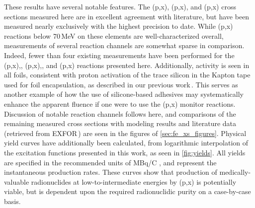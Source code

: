 These results have several notable features.
The 
(p,x), (p,x), and (p,x) cross sections measured here are in excellent agreement with 
literature,  but have been measured nearly exclusively with the highest precision to date.
While (p,x) reactions below 70\,MeV on these elements are well-characterized overall, measurements of several reaction channels are somewhat sparse in comparison.
Indeed, fewer than four existing measurements have been performed for the (p,x),, (p,x),, and (p,x)
reactions presented here.
Additionally,  activity is seen in all foils, consistent with proton activation of the trace  silicon in the Kapton tape used for foil encapsulation, as described in our previous work\,\cite{Voyles2018a}.
This serves as another example of how the use of silicone-based adhesives may systematically enhance the apparent fluence if one were to use the (p,x) monitor reactions.
Discussion of notable reaction channels follows here, and 
comparisons  of the
remaining measured cross sections 
with modeling results and literature data (retrieved from EXFOR\,\cite{Otuka2014272}) are seen in the figures of 
\ref{sec:fe_xs_figures}.
Physical yield curves have additionally been calculated,  from logarithmic interpolation of the excitation functions presented in this work, as seen in \autoref{fig:yields}.
All yields are specified in the recommended units of MBq/C \cite{Otuka2015}, and  represent the instantaneous production rates.
These curves show that production of medically-valuable radionuclides at low-to-intermediate energies by (p,x) is potentially viable, but is dependent upon  the required radionuclidic purity on a case-by-case basis.



